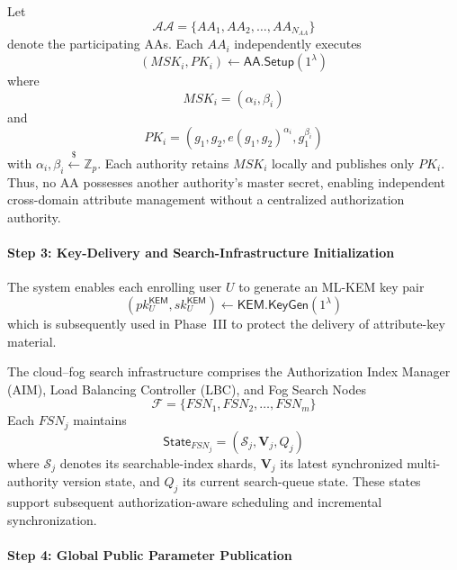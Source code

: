 \documentclass{ieeetj}
\theoremstyle{ieee-style}
\begin{document}
Let
\begin{equation}
\mathcal{AA}
=
\{AA_1,AA_2,\ldots,AA_{N_{AA}}\}
\end{equation}
denote the participating AAs. Each $AA_i$ independently executes
\begin{equation}
(MSK_i,PK_i)
\leftarrow
\mathsf{AA.Setup}(1^\lambda)
\end{equation}
where
\begin{equation}
MSK_i=(\alpha_i,\beta_i)
\end{equation}
and
\begin{equation}
PK_i=
\left(
g_1,g_2,
e(g_1,g_2)^{\alpha_i},
g_1^{\beta_i}
\right)
\end{equation}
with $\alpha_i,\beta_i\overset{\$}{\leftarrow}\mathbb{Z}_p$.
Each authority retains $MSK_i$ locally and publishes only $PK_i$.
Thus, no AA possesses another authority's master secret, enabling
independent cross-domain attribute management without a centralized
authorization authority.

\paragraph*{Step 3: Key-Delivery and Search-Infrastructure Initialization}

The system enables each enrolling user $U$ to generate an ML-KEM key pair
\begin{equation}
(pk_U^{\mathsf{KEM}},sk_U^{\mathsf{KEM}})
\leftarrow
\mathsf{KEM.KeyGen}(1^\lambda)
\end{equation}
which is subsequently used in Phase~III to protect the delivery of
attribute-key material.

The cloud--fog search infrastructure comprises the Authorization Index
Manager (AIM), Load Balancing Controller (LBC), and Fog Search Nodes
\begin{equation}
\mathcal{F}
=
\{FSN_1,FSN_2,\ldots,FSN_m\}
\end{equation}
Each $FSN_j$ maintains
\begin{equation}
\mathsf{State}_{FSN_j}
=
(\mathcal{S}_j,\mathbf{V}_j,Q_j)
\end{equation}
where $\mathcal{S}_j$ denotes its searchable-index shards,
$\mathbf{V}_j$ its latest synchronized multi-authority version state,
and $Q_j$ its current search-queue state. These states support subsequent
authorization-aware scheduling and incremental synchronization.

\paragraph*{Step 4: Global Public Parameter Publication}
\end{document}
